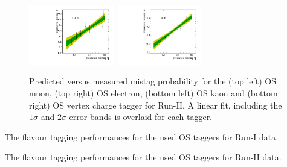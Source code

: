 \begin{figure}[h]
\includegraphics[height=!,width=0.33\textwidth]{figs/Tagging/Run2/OS_nnetKaon_Calibration.pdf}
\includegraphics[height=!,width=0.33\textwidth]{figs/Tagging/Run2/VtxCharge_Calibration.pdf}
\caption{\small Predicted versus measured mistag probability for the (top left) OS muon, (top right) OS electron, (bottom left) OS kaon and (bottom right) OS vertex charge tagger for Run-II. 
A linear fit, including the $1\sigma$ and $2\sigma$ error bands is overlaid for each tagger.}
\label{fig:OSdistribution_Run2}
\end{figure}

\clearpage
\begin{table}[h]
\centering
\caption{The flavour tagging performances for the used OS taggers for Run-I data.}
\resizebox{\linewidth}{!}{
	
}
\label{tab:OS_Run1}
%
\caption{The flavour tagging performances for the used OS taggers for Run-II data.}
\resizebox{\linewidth}{!}{
	
}
\label{tab:OS_Run2}
\end{table}



